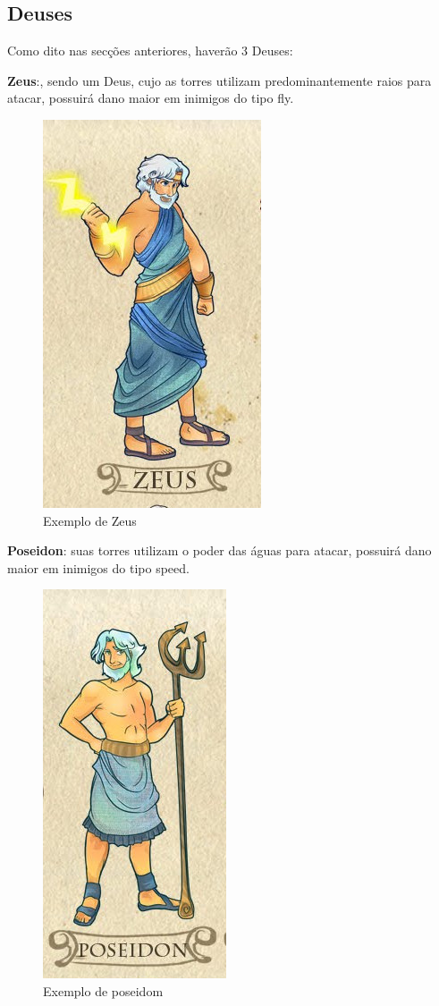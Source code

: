 \documentclass[11pt]{article} %
\begin{document}
\subsection{Deuses}
Como dito nas secções anteriores, haverão 3 Deuses:

{\large \textbf{Zeus}}:, sendo um Deus, cujo as torres utilizam predominantemente raios para atacar, possuirá dano maior em inimigos do tipo fly.
\begin{figure}[!htp]
\centering
\includegraphics[scale=0.25]{res/characters/zeus.png}
\caption{Exemplo de Zeus}
\label{zeus}
\end{figure}

{\large \textbf{Poseidon}}: suas torres utilizam o poder das águas para atacar, possuirá dano maior em  inimigos do tipo speed.
\begin{figure}[!htp]
\centering
\includegraphics[scale=0.25]{res/characters/poseidom.png}
\caption{Exemplo de poseidom}
\label{poseidom}
\end{figure}
\end{document}

